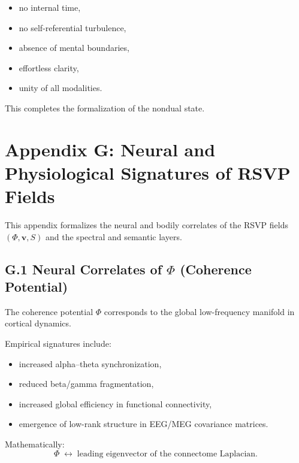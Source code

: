 \documentclass[12pt]{article}
\begin{document}
\begin{itemize}
    \item no internal time,
    \item no self-referential turbulence,
    \item absence of mental boundaries,
    \item effortless clarity,
    \item unity of all modalities.
\end{itemize}

This completes the formalization of the nondual state.


\section*{Appendix G: Neural and Physiological Signatures of RSVP Fields}

This appendix formalizes the neural and bodily correlates of the RSVP fields
$(\Phi, \mathbf{v}, S)$ and the spectral and semantic layers.

\subsection*{G.1 Neural Correlates of $\Phi$ (Coherence Potential)}

The coherence potential $\Phi$ corresponds to the global low-frequency manifold
in cortical dynamics.

Empirical signatures include:

\begin{itemize}
    \item increased alpha--theta synchronization,
    \item reduced beta/gamma fragmentation,
    \item increased global efficiency in functional connectivity,
    \item emergence of low-rank structure in EEG/MEG covariance matrices.
\end{itemize}

Mathematically:
\[
\Phi \;\leftrightarrow\;
\text{leading eigenvector of the connectome Laplacian}.
\]
\end{document}
